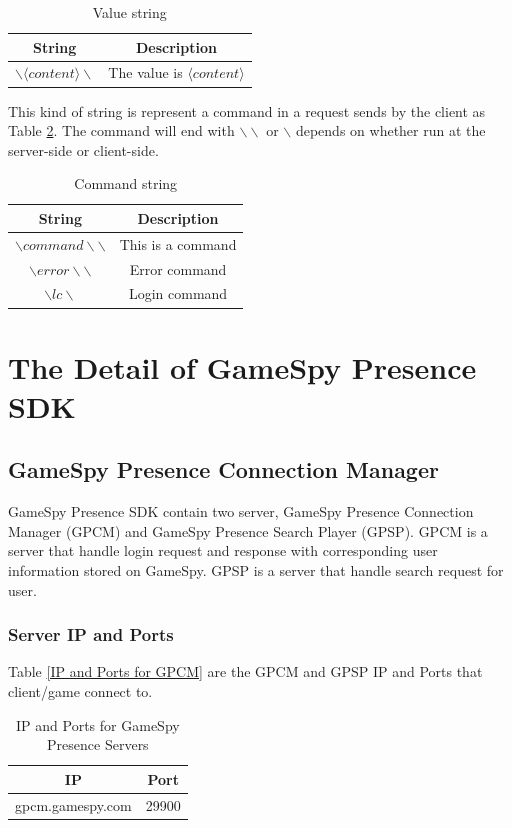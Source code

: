 \documentclass[oneside,titlepage,a4paper]{Definition/retrospy} %
\begin{document}
\begin{table}[H]
	\centering
	\begin{tabular}{|c|c|}
		\hline 
		\textbf{String}&\textbf{Description}  \\ 
		\hline 
		$ \backslash \langle content \rangle \backslash $& The value is $ \langle content \rangle $  \\ 
		\hline 
	\end{tabular} 
	\caption{Value string}
	\label{Value string}
\end{table}

This kind of string is represent a command in a request sends by the client as Table \ref{Command string}. The command will end with $ \backslash \backslash $ or $ \backslash $ depends on whether run at the server-side or client-side.


\begin{table}[H]
	\centering
	\begin{tabular}{|c|c|}
		\hline 
		\textbf{String}&\textbf{Description}  \\ 
		\hline 
		$ \backslash command \backslash\backslash $& This is a command \\ 		
		\hline 
		$ \backslash error \backslash \backslash $ & Error command \\
		\hline
		$\backslash lc \backslash$& Login command\\
		\hline
	\end{tabular} 
	\caption{Command string}
	\label{Command string}
\end{table}



\chapter{The Detail of GameSpy Presence SDK}
\section{GameSpy Presence Connection Manager}
\par GameSpy Presence SDK contain two server, GameSpy Presence Connection Manager (GPCM) and GameSpy Presence Search Player (GPSP). GPCM is a server that handle login request and response with corresponding user information stored on GameSpy. GPSP is a server that handle search request for user.
\subsection{Server IP and Ports}
Table \ref{IP and Ports for GPCM} are the GPCM and GPSP IP and Ports that client/game connect to.
\begin{table}[H]
	\centering
	\begin{tabular}{|c|c|}
		\hline 
		\textbf{IP}&\textbf{Port}\\ 
		\hline 
		gpcm.gamespy.com&29900 \\ 
	 	\hline 
	\end{tabular} 
\caption{IP and Ports for GameSpy Presence Servers}
\label{IP and Ports for GameSpy Presence Servers}

\end{table}
\end{document}
